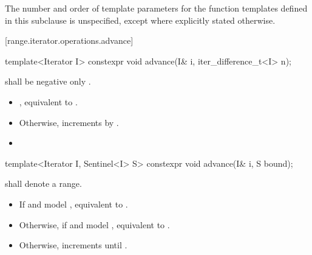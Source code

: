 \begin{addedblock}
{\color{newclr}
\pnum
The number and order of template parameters for the function templates defined
in this subclause is unspecified, except where explicitly stated otherwise.
} %

[range.iterator.operations.advance]{}
%
\begin{itemdecl}
template<Iterator I>
  constexpr void advance(I& i, iter_difference_t<I> n);
\end{itemdecl}

\begin{itemdescr}
\pnum
\expects
{} shall be negative only 
.

\pnum
\effects
\begin{itemize}
\item {}
  ,
  equivalent to .
\item Otherwise,  increments
   by .
\item {}
\end{itemize}
\end{itemdescr}

%
\begin{itemdecl}
template<Iterator I, Sentinel<I> S>
  constexpr void advance(I& i, S bound);
\end{itemdecl}

\begin{itemdescr}
\pnum
\expects
{} 
shall denote a range.

\pnum
\effects
\begin{itemize}
\item If  and  model ,
  equivalent to .
\item Otherwise, if  and  model ,
  equivalent to .
\item Otherwise, increments  until
   .
\end{itemize}
\end{itemdescr}


\end{addedblock}
